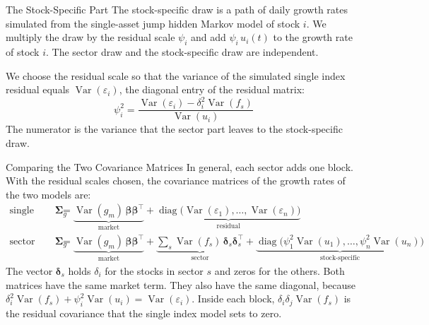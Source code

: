 \documentclass[aspectratio=169,11pt]{beamer}
\begin{document}
\begin{frame}{The Stock-Specific Part}
  The stock-specific draw is a path of daily growth rates simulated from the single-asset jump hidden
  Markov model of stock $i$.
  We multiply the draw by the residual scale $\psi_i$ and add $\psi_i\,u_i(t)$ to the growth rate
  of stock $i$. The sector draw and the
  stock-specific draw are independent.

  \vspace{0.5em}
  We choose the residual scale so that the variance of the simulated single index residual equals
  $\operatorname{Var}(\varepsilon_i)$, the diagonal entry of the residual matrix:
  \begin{equation*}
    \boxed{\psi_i^2=\frac{\operatorname{Var}(\varepsilon_i)-\delta_i^2\operatorname{Var}(f_s)}{\operatorname{Var}(u_i)}}
  \end{equation*}
  The numerator is the variance that the sector part leaves to the stock-specific draw.
\end{frame}

\begin{frame}{Comparing the Two Covariance Matrices}
  In general, each sector adds one block. With the residual scales chosen, the covariance matrices
  of the growth rates of the two models are:
  {\small\begin{align*}
    \text{single index:}\;\symbf{\Sigma}_{g} &= \underbrace{\operatorname{Var}(g_{m})\,\boldsymbol{\beta}\boldsymbol{\beta}^{\top}}_{\textstyle\text{market}} + \underbrace{\operatorname{diag}\big(\operatorname{Var}(\varepsilon_{1}),\dotsc,\operatorname{Var}(\varepsilon_{n})\big)}_{\textstyle\text{residual}}\\[4pt]
    \text{sector factor:}\;\symbf{\Sigma}_{g} &= \underbrace{\operatorname{Var}(g_{m})\,\boldsymbol{\beta}\boldsymbol{\beta}^{\top}}_{\textstyle\text{market}} + \underbrace{\textstyle\sum_{s}\operatorname{Var}(f_{s})\,\boldsymbol{\delta}_{s}\boldsymbol{\delta}_{s}^{\top}}_{\textstyle\text{sector}} + \underbrace{\operatorname{diag}\big(\psi_{1}^{2}\operatorname{Var}(u_{1}),\dotsc,\psi_{n}^{2}\operatorname{Var}(u_{n})\big)}_{\textstyle\text{stock-specific}}
  \end{align*}}%
  \noindent The vector $\boldsymbol{\delta}_s$ holds $\delta_i$ for the stocks in sector $s$ and zeros for the
  others. Both matrices have the same market term. They also have the same diagonal, because
  $\delta_i^2\operatorname{Var}(f_s)+\psi_i^2\operatorname{Var}(u_i)=\operatorname{Var}(\varepsilon_i)$.
  Inside each block, $\delta_i\delta_j\operatorname{Var}(f_s)$ is the residual covariance that the
  single index model sets to zero.
\end{frame}
\end{document}
